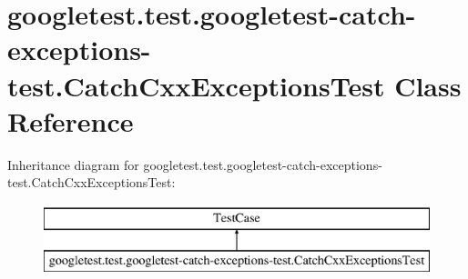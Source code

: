 \hypertarget{classgoogletest_1_1test_1_1googletest-catch-exceptions-test_1_1_catch_cxx_exceptions_test}{}\section{googletest.\+test.\+googletest-\/catch-\/exceptions-\/test.Catch\+Cxx\+Exceptions\+Test Class Reference}
\label{classgoogletest_1_1test_1_1googletest-catch-exceptions-test_1_1_catch_cxx_exceptions_test}
Inheritance diagram for googletest.\+test.\+googletest-\/catch-\/exceptions-\/test.Catch\+Cxx\+Exceptions\+Test\+:\begin{figure}[H]
\begin{center}
\leavevmode
\includegraphics[height=2.000000cm]{d9/d18/classgoogletest_1_1test_1_1googletest-catch-exceptions-test_1_1_catch_cxx_exceptions_test}
\end{center}
\end{figure}

